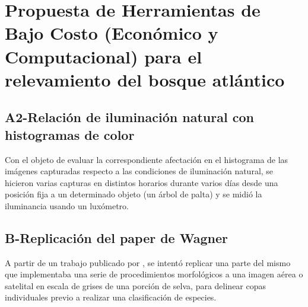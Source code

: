 \section{ Propuesta de Herramientas de Bajo Costo (Económico y Computacional) para el relevamiento del bosque atlántico}
\subsection{A2-Relación de iluminación natural con histogramas de color}
Con el objeto de evaluar la correspondiente afectación en el histograma de las imágenes capturadas respecto a las condiciones de iluminación natural, se hicieron varias capturas en distintos horarios durante varios días desde una posición fija a un determinado objeto (un árbol de palta) y se midió la iluminancia usando un luxómetro.
\subsection{B-Replicación del paper de Wagner}
A partir de un trabajo publicado por \cite{hubert_wagner_individual_2018}, se intentó replicar una parte del mismo que implementaba una serie de procedimientos morfológicos a una imagen aérea o satelital en escala de grises de una porción de selva, para delinear copas individuales previo a realizar una clasificación de especies.
